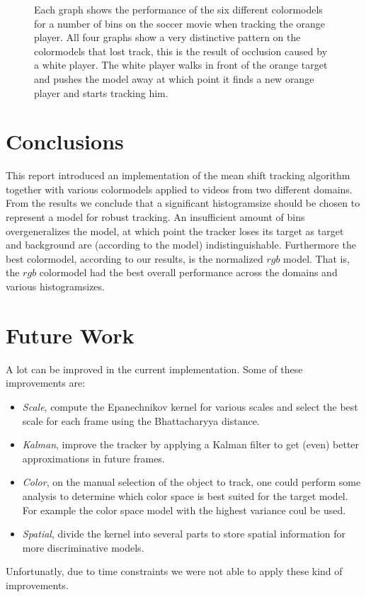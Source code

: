 \documentclass[11pt]{article}
\begin{document}
\begin{figure}[!ht]
{\label{fig:d}
}
\caption{Each graph shows the performance of the six different colormodels for
a number of bins on the soccer movie when tracking the orange player. All four
graphs show a very distinctive pattern on the colormodels that lost track, this
is the result of occlusion caused by a white player. The white player walks in
front of the orange target and pushes the model away at which point it finds a
new orange player and starts tracking him.}
\label{fig:soccer}
\end{figure}

\newpage
\section{Conclusions}
This report introduced an implementation of the mean shift tracking algorithm
together with various colormodels applied to videos from two different domains.
From the results we conclude that a significant histogramsize should be chosen
to represent a model for robust tracking. An insufficient amount of bins
overgeneralizes the model, at which point the tracker loses its target as
target and background are (according to the model) indistinguishable.
Furthermore the best colormodel, according to our results, is the normalized
$rgb$ model. That is, the $rgb$ colormodel had the best overall performance across
the domains and various histogramsizes.


\section{Future Work}
A lot can be improved in the current implementation. Some of these improvements
are:
\begin{itemize}
\item{\emph{Scale}, compute the Epanechnikov kernel for various scales and
select the best scale for each frame using the Bhattacharyya distance.}
\item{\emph{Kalman}, improve the tracker by applying a Kalman filter to get
(even) better approximations in future frames.}
\item{\emph{Color}, on the manual selection of the object to track, one could
perform some analysis to determine which color space is best suited for the
target model. For example the color space model with the highest variance coul
be used.}
\item{\emph{Spatial}, divide the kernel into several parts to store spatial
information for more discriminative models.}
\end{itemize}
Unfortunatly, due to time constraints we were not able to apply these kind of
improvements.

\renewcommand\bibname{References}


\end{document}
